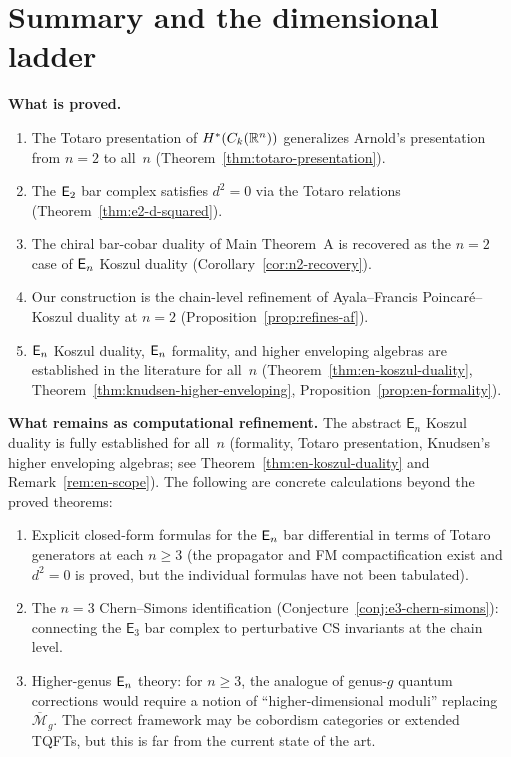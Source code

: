 \section{Summary and the dimensional ladder}
\label{sec:en-summary}

\noindent
\textbf{What is proved.}
\begin{enumerate}
\item The Totaro presentation of $H^*(C_k(\mathbb{R}^n))$ generalizes
  Arnold's presentation from $n = 2$ to all~$n$
  (Theorem~\ref{thm:totaro-presentation}).
\item The $\mathsf{E}_2$ bar complex satisfies $d^2 = 0$ via the Totaro
  relations (Theorem~\ref{thm:e2-d-squared}).
\item The chiral bar-cobar duality of Main Theorem~A is recovered
  as the $n = 2$ case of $\mathsf{E}_n$ Koszul duality
  (Corollary~\ref{cor:n2-recovery}).
\item Our construction is the chain-level refinement of
  Ayala--Francis Poincar\'e--Koszul duality at $n = 2$
  (Proposition~\ref{prop:refines-af}).
\item $\mathsf{E}_n$ Koszul duality, $\mathsf{E}_n$ formality, and higher enveloping
  algebras are established in the literature for all~$n$
  (Theorem~\ref{thm:en-koszul-duality},
  Theorem~\ref{thm:knudsen-higher-enveloping},
  Proposition~\ref{prop:en-formality}).
\end{enumerate}

\noindent
\textbf{What remains as computational refinement.}
The abstract $\mathsf{E}_n$ Koszul duality is fully established
for all~$n$ (formality, Totaro presentation, Knudsen's higher
enveloping algebras; see
Theorem~\ref{thm:en-koszul-duality} and
Remark~\ref{rem:en-scope}).
The following are concrete calculations beyond the proved theorems:
\begin{enumerate}
\item Explicit closed-form formulas for the $\mathsf{E}_n$ bar differential
  in terms of Totaro generators at each $n \geq 3$
  (the propagator and FM compactification exist and $d^2 = 0$ is
  proved, but the individual formulas have not been tabulated).
\item The $n = 3$ Chern--Simons identification
  (Conjecture~\ref{conj:e3-chern-simons}): connecting the
  $\mathsf{E}_3$ bar complex to perturbative CS invariants at the
  chain level.
\item Higher-genus $\mathsf{E}_n$ theory: for $n \geq 3$, the analogue of
  genus-$g$ quantum corrections would require a notion of
  ``higher-dimensional moduli'' replacing $\overline{\mathcal{M}}_g$.
  The correct framework may be cobordism categories or extended
  TQFTs, but this is far from the current state of the art.
\end{enumerate}

